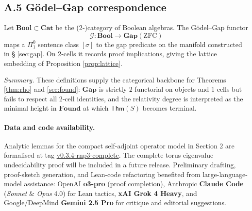\documentclass[11pt]{article}
\newcommand{\leanRepoTag}{%
  \href{https://github.com/AICardiologist/FoundationRelativity/tree/v0.3.4-rnp3-complete}%
       {v0.3.4-rnp3-complete}}
\newcommand{\llmNote}{%
  Preliminary drafting, proof-sketch generation, and Lean-code
  refactoring benefited from large-language-model assistance:
  OpenAI \textbf{o3-pro} (proof completion),
  Anthropic \textbf{Claude Code} (\emph{Sonnet} \& \emph{Opus} 4.0) for Lean tactics,
  \textbf{xAI Grok 4 Heavy}, and Google/DeepMind \textbf{Gemini 2.5 Pro}
  for critique and editorial suggestions.
}
\theoremstyle{definition}\newtheorem{definition}[theorem]{Definition}
\theoremstyle{remark}\newtheorem{remark}[theorem]{Remark}
\newcommand{\Found}{\mathbf{Found}}
\newcommand{\Gap}{\mathbf{Gap}}
\begin{document}
\subsection*{A.5 Gödel–Gap correspondence}
Let \(\mathbf{Bool}\subset\mathbf{Cat}\) be the (2‑)category of Boolean
algebras.  The Gödel–Gap functor
\[
  \mathcal G:\mathbf{Bool}\longrightarrow\Gap(\mathrm{ZFC})
\]
maps a $\Pi^0_1$ sentence class $[\sigma]$ to the gap predicate on the
manifold constructed in § \ref{sec:gap}.  On 2‑cells it records proof
implications, giving the lattice embedding of
Proposition \ref{prop:lattice}.

\vspace{0.5em}
\noindent
\emph{Summary.}  These definitions supply the categorical backbone for
Theorems \ref{thm:rho} and \ref{sec:found}: $\Gap$ is strictly
2‑functorial on objects and 1‑cells but fails to respect all 2‑cell
identities, and the relativity degree is interpreted as the minimal
height in \(\Found\) at which $\mathsf{Thm}(S)$ becomes terminal.


\paragraph{Data and code availability.}
Analytic lemmas for the compact self-adjoint operator model in Section 2
are formalised at tag \leanRepoTag.
The complete torus eigenvalue undecidability proof will be included in a
future release.
\llmNote
\end{document}

